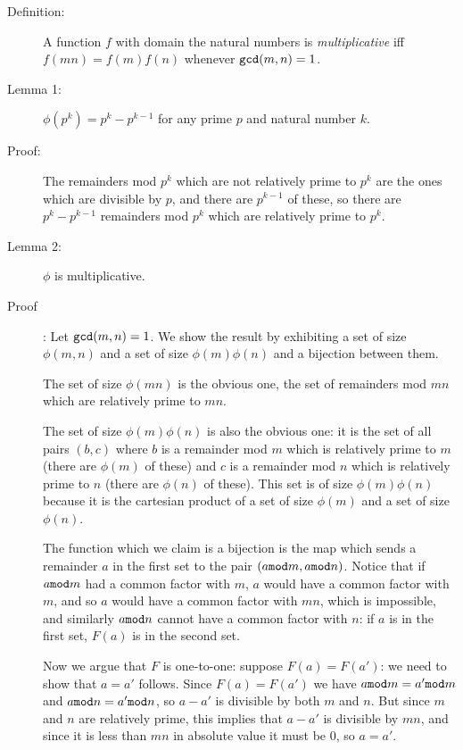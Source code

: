 \documentclass[12pt]{article}
\begin{document}
\begin{description}

\item[Definition:]   A function $f$ with domain the natural numbers is {\em multiplicative\/} iff $f(mn)=f(m)f(n)$ whenever ${\tt gcd}(m,n)=1$.

\item[Lemma 1:]   $\phi(p^k)= p^k-p^{k-1}$ for any prime $p$ and natural number $k$.

\item[Proof:]   The remainders mod $p^k$ which are not relatively prime to $p^k$ are the ones which are divisible by $p$, and there are $p^{k-1}$ of these, so there
are $p^k-p^{k-1}$ remainders mod $p^k$ which are relatively prime to $p^k$.

\item[Lemma 2:]  $\phi$ is multiplicative.

\item[Proof]:   Let ${\tt gcd}(m,n)=1$.   We show the result by exhibiting a set of size $\phi(m,n)$ and a set of size $\phi(m)\phi(n)$ and a bijection between them.

The set of size $\phi(mn)$ is the obvious one, the set of remainders mod $mn$ which are relatively prime to $mn$.

The set of size $\phi(m)\phi(n)$ is also the obvious one:  it is the set of all pairs $(b,c)$ where $b$ is a remainder mod $m$ which is relatively prime to $m$ (there are $\phi(m)$ of these) and $c$ is a remainder mod $n$ which is relatively prime to $n$ (there are $\phi(n)$ of these).  This set is of size  $\phi(m)\phi(n)$ because it is the cartesian product of a set of size $\phi(m)$ and a set of size $\phi(n)$.

The function which we claim is a bijection is the map which sends a remainder $a$ in the first set to the pair $(a{\tt mod}m,a{\tt mod}n)$.   Notice that if $a{\tt mod}m$ had a common factor with $m$, $a$ would have a common factor with $m$, and so $a$ would have a common factor with $mn$, which is impossible, and similarly $a{\tt mod}n$ cannot have a common factor with $n$:  if $a$ is in the first set, $F(a)$ is in the second set.

Now we argue that $F$ is one-to-one:   suppose $F(a)=F(a')$:  we need to show that $a=a'$ follows.   Since $F(a)=F(a')$ we have $a{\tt mod}m=a'{\tt mod}m$ and $a{\tt mod}n=a'{\tt mod}n$, so $a-a'$ is divisible by both $m$ and $n$.
But since $m$ and $n$ are relatively prime, this implies that $a-a'$ is divisible by $mn$, and since it is less than $mn$ in absolute value it must be 0, so $a=a'$.


\end{description}
\end{document}
